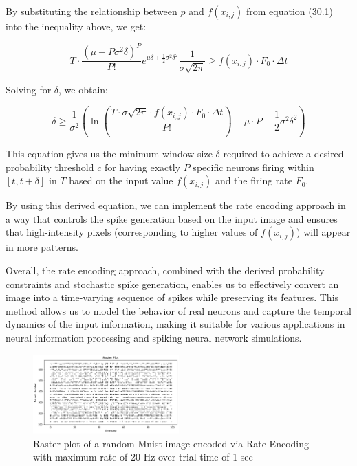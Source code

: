 By substituting the relationship between \(p\) and \(f(x_{i,j})\) from equation (30.1) into the inequality above, we get:

\begin{equation}
T \cdot \frac{(\mu + P\sigma^2\delta)^P}{P!} e^{\mu\delta + \frac{1}{2}\sigma^2 \delta^2} \frac{1}{\sigma \sqrt{2\pi}} \geq f(x_{i,j}) \cdot F_0 \cdot \Delta t
\end{equation}

Solving for \(\delta\), we obtain:

\begin{equation}
\delta \geq \frac{1}{\sigma^2}\left(\ln\left(\frac{T \cdot \sigma \sqrt{2\pi} \cdot f(x_{i,j}) \cdot F_0 \cdot \Delta t}{P!}\right) - \mu \cdot P - \frac{1}{2}\sigma^2 \delta^2\right)
\end{equation}

This equation gives us the minimum window size \(\delta\) required to achieve a desired probability threshold \(c\) for having exactly \(P\) specific neurons firing within \([t, t + \delta]\) in \(T\) based on the input value \(f(x_{i,j})\) and the firing rate \(F_0\).

By using this derived equation, we can implement the rate encoding approach in a way that controls the spike generation based on the input image and ensures that high-intensity pixels (corresponding to higher values of \(f(x_{i,j})\)) will appear in more patterns.

Overall, the rate encoding approach, combined with the derived probability constraints and stochastic spike generation, enables us to effectively convert an image into a time-varying sequence of spikes while preserving its features. This method allows us to model the behavior of real neurons and capture the temporal dynamics of the input information, making it suitable for various applications in neural information processing and spiking neural network simulations.

\begin{figure}[H]
    \centering
    \includegraphics[width=0.5\textwidth]{methods/spike-encoding/graphs/rate-encoding-raster.png}
    \caption{Raster plot of a random Mnist image encoded via Rate Encoding with maximum rate of 20 Hz over trial time of 1 sec}
    \label{fig:rate-encoding-raster}
\end{figure}
